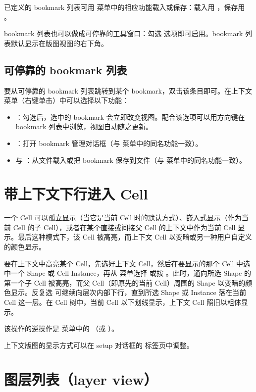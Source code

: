 已定义的 bookmark 列表可用  菜单中的相应功能载入或保存：载入用 ，保存用 。

bookmark 列表也可以做成可停靠的工具窗口：勾选  选项即可启用。bookmark 列表默认显示在版图视图的右下角。

\subsection{可停靠的 bookmark 列表}

要从可停靠的 bookmark 列表跳转到某个 bookmark，双击该条目即可。在上下文菜单（右键单击）中可以选择以下功能：

\begin{itemize}
\item {}：勾选后，选中的 bookmark 会立即改变视图。配合该选项可以用方向键在 bookmark 列表中浏览，视图自动随之更新。
\item {}：打开 bookmark 管理对话框（与  菜单中的同名功能一致）。
\item {} 与 ：从文件载入或把 bookmark 保存到文件（与  菜单中的同名功能一致）。
\end{itemize}

\section{带上下文下行进入 Cell}\label{sec:descend}

一个 Cell 可以孤立显示（当它是当前 Cell 时的默认方式）、嵌入式显示（作为当前 Cell 的子 Cell），或者在某个直接或间接父 Cell 的上下文中作为当前 Cell 显示。最后这种模式下，该 Cell 被高亮，而上下文 Cell 以变暗或另一种用户自定义的颜色显示。

要在上下文中高亮某个 Cell，先选好上下文 Cell，然后在要显示的那个 Cell 中选中一个 Shape 或 Cell Instance，再从  菜单选择  或按 。此时，通向所选 Shape 的第一个子 Cell 被高亮，而父 Cell（即原先的当前 Cell）周围的 Shape 以变暗的颜色显示。反复选  可继续向层次内部下行，直到所选 Shape 或 Instance 落在当前 Cell 这一层。在 Cell 树中，当前 Cell 以下划线显示，上下文 Cell 照旧以粗体显示。

该操作的逆操作是  菜单中的 （或 ）。

上下文版图的显示方式可以在 setup 对话框的  标签页中调整。

\section{图层列表（layer view）}\label{sec:layer_views}

